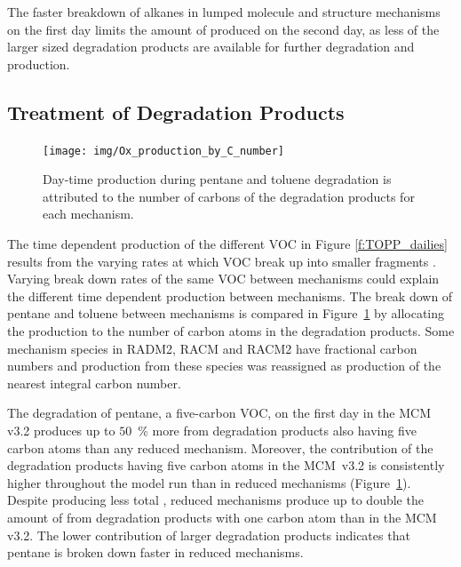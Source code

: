 The faster breakdown of alkanes in lumped molecule and structure mechanisms on the first day limits the amount of  produced on the second day, as less of the larger sized degradation products are available for further degradation and  production.  
%
\subsection{Treatment of Degradation Products} \label{ss:products} 
%
\begin{figure}
    \centering
    \texttt{[image: img/Ox\_production\_by\_C\_number]}
    \vspace{0mm}
    \caption{Day-time  production during pentane and toluene degradation is attributed to the number of carbons of the degradation products for each mechanism.}
    \vspace{-4mm}
    \label{f:carbon}
\end{figure}
%
The time dependent  production of the different VOC in Figure \ref{f:TOPP_dailies} results from the varying rates at which VOC break up into smaller fragments \citep{Butler:2011}.
Varying break down rates of the same VOC between mechanisms could explain the different time dependent  production between mechanisms.
The break down of pentane and toluene between mechanisms is compared in \mbox{Figure \ref{f:carbon}} by allocating the  production to the number of carbon atoms in the degradation products.
Some mechanism species in RADM2, RACM and RACM2 have fractional carbon numbers \citep{Stockwell:1990, Stockwell:1997, Goliff:2013} and  production from these species was reassigned as  production of the nearest integral carbon number.  

The degradation of pentane, a five-carbon VOC, on the first day in the MCM v3.2 produces up to \mbox{$50$ \%} more  from degradation products also having five carbon atoms than any reduced mechanism.
Moreover, the contribution of the degradation products having five carbon atoms in the \mbox{MCM v3.2} is consistently higher throughout the model run than in reduced mechanisms \mbox{(Figure \ref{f:carbon}).}
Despite producing less total , reduced mechanisms produce up to double the amount of  from degradation products with one carbon atom than in the MCM v3.2.
The lower contribution of larger degradation products indicates that pentane is broken down faster in reduced mechanisms.

